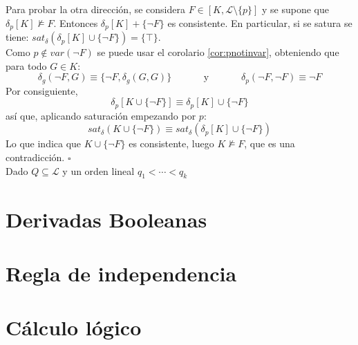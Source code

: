 Para probar la otra dirección, se considera $F\in [K, \mathcal{L} \setminus \{ p \}]$ y se supone que $\delta_p [K] \nvDash F$. Entonces $\delta_p [K] + \{ \neg F \}$ es consistente. En particular, si se satura se tiene: $sat_{\delta}(\delta_p [K] \cup \{ \neg F \}) = \{ \top \}$.\\
Como $p \notin var(\neg F)$ se puede usar el corolario \ref{cor:pnotinvar}, obteniendo que para todo $G\in K$:
$$\delta_g (\neg F, G) \equiv \{ \neg F, \delta_g  (G,G)  \} \;\;\;\;\;\;\;\;\;\;\;\; \text{y} \;\;\;\;\;\;\;\;\;\;\;\; \delta_p (\neg F , \neg F) \equiv \neg F$$
Por consiguiente,
$$\delta_p [K \cup \{ \neg F \}] \equiv \delta_p [K] \cup \{ \neg F \}$$
así que, aplicando saturación empezando por $p$:
$$sat_{\delta}(K \cup \{ \neg F \}) \equiv sat_{\delta}(\delta_p [K] \cup \{ \neg F \})$$
Lo que indica que $K \cup \{ \neg F \}$ es consistente, luego $K \nvDash F$, que es una contradicción. $\square$\\

Dado $Q \subseteq \mathcal{L}$ y un orden lineal $q_1 < \cdots < q_k$

\section{Derivadas Booleanas}

\section{Regla de independencia}

\section{Cálculo lógico}